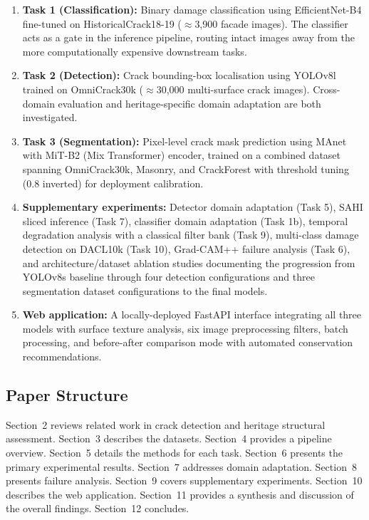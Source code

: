 \documentclass[12pt,a4paper]{article}
\begin{document}
\begin{enumerate}[leftmargin=1.5cm]
\item \textbf{Task 1 (Classification):} Binary damage classification using EfficientNet-B4 fine-tuned on HistoricalCrack18-19 ($\approx$3,900 facade images). The classifier acts as a gate in the inference pipeline, routing intact images away from the more computationally expensive downstream tasks.

\item \textbf{Task 2 (Detection):} Crack bounding-box localisation using YOLOv8l trained on OmniCrack30k ($\approx$30,000 multi-surface crack images). Cross-domain evaluation and heritage-specific domain adaptation are both investigated.

\item \textbf{Task 3 (Segmentation):} Pixel-level crack mask prediction using MAnet with MiT-B2 (Mix Transformer) encoder, trained on a combined dataset spanning OmniCrack30k, Masonry, and CrackForest with threshold tuning (0.8 inverted) for deployment calibration.

\item \textbf{Supplementary experiments:} Detector domain adaptation (Task 5), SAHI sliced inference (Task 7), classifier domain adaptation (Task 1b), temporal degradation analysis with a classical filter bank (Task 9), multi-class damage detection on DACL10k (Task 10), Grad-CAM++ failure analysis (Task 6), and architecture/dataset ablation studies documenting the progression from YOLOv8s baseline through four detection configurations and three segmentation dataset configurations to the final models.

\item \textbf{Web application:} A locally-deployed FastAPI interface integrating all three models with surface texture analysis, six image preprocessing filters, batch processing, and before-after comparison mode with automated conservation recommendations.
\end{enumerate}

\subsection{Paper Structure}

Section~2 reviews related work in crack detection and heritage structural assessment. Section~3 describes the datasets. Section~4 provides a pipeline overview. Section~5 details the methods for each task. Section~6 presents the primary experimental results. Section~7 addresses domain adaptation. Section~8 presents failure analysis. Section~9 covers supplementary experiments. Section~10 describes the web application. Section~11 provides a synthesis and discussion of the overall findings. Section~12 concludes.
\end{document}
